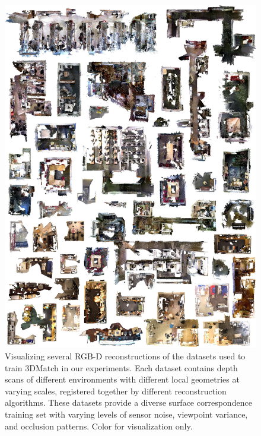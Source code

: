 \documentclass[10pt,twocolumn,letterpaper]{article}
\begin{document}
\begin{figure}
\centering
\includegraphics[width=0.95\linewidth]{images/reconstruction-datasets.jpg}
\caption{Visualizing several RGB-D reconstructions of the datasets used to train 3DMatch in our experiments. Each dataset contains depth scans of different environments with different local geometries at varying scales, registered together by different reconstruction algorithms. These datasets provide a diverse surface correspondence training set with varying levels of sensor noise, viewpoint variance, and occlusion patterns. Color for visualization only.}
\label{fig:reconstruction-datasets}
\end{figure}







{\small


}
\end{document}
